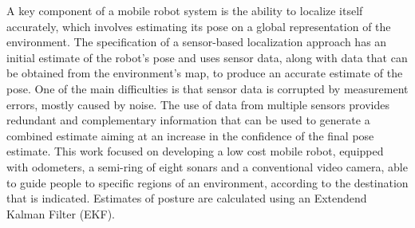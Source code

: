 
A key component of a mobile robot system is the ability to localize itself accurately, which involves estimating its pose on a global representation of the environment. The specification of a sensor-based localization approach has an initial estimate of the robot's pose and uses sensor data, along with data that can be obtained from the environment's map, to produce an accurate estimate of the pose. One of the main difficulties is that sensor data is corrupted by measurement errors, mostly caused by noise. The use of data from multiple sensors provides redundant and complementary information that can be used to generate a combined estimate aiming at an increase in the confidence of the final pose estimate. This work focused on developing a low cost mobile robot, equipped with odometers, a semi-ring of eight sonars and a conventional video camera, able to guide people to specific regions of an environment, according to the destination that is indicated. Estimates of posture are calculated using an Extendend Kalman Filter (EKF).